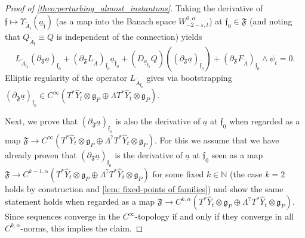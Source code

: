 \documentclass[11pt,a4paper]{scrartcl}
\numberwithin{equation}{section}
\theoremstyle{plain}
\theoremstyle{definition}
\theoremstyle{remark}
\begin{document}
\begin{proof}[Proof of \autoref{theo:perturbing_almost_instantons}]
Taking the derivative of $\mathfrak{f}\mapsto \Upsilon_{\tilde{A}_\mathfrak{f}}(\underline{a}_\mathfrak{f})$ (as a map into the Banach space $W^{0,\alpha}_{-2-\varepsilon,t}$) at $\mathfrak{f}_0 \in \mathfrak{F}$ (and noting that $Q_{\tilde{A}_{\mathfrak{f}}} \equiv Q$ is independent of the connection) yields \[ L_{\tilde{A}_{\mathfrak{f}_0}} (\partial_\mathfrak{F}\underline{a})_{\mathfrak{f}_0} + (\partial_\mathfrak{F}L_{\tilde{A}})_{\mathfrak{f}_0} \underline{a}_{\mathfrak{f}_0} + (D_{\underline{a}_{\mathfrak{f}_0}}Q)((\partial_\mathfrak{F}\underline{a})_{\mathfrak{f}_0}) + (\partial_\mathfrak{F}F_{\tilde{A}})_{\mathfrak{f}_0} \wedge \psi_t = 0.\] Elliptic regularity of the operator $L_{\tilde{A}_{\mathfrak{f}_0}}$ gives via bootstrapping $(\partial_\mathfrak{F}\underline{a})_{\mathfrak{f}_0} \in C^{\infty}(T^*\hat{Y}_t\otimes \mathfrak{g}_P \oplus \Lambda T^*\hat{Y}_t \otimes \mathfrak{g}_P)$. 

Next, we prove that $(\partial_\mathfrak{F}\underline{a})_{\mathfrak{f}_0}$ is also the derivative of $\underline{a}$ at ${\mathfrak{f}_0}$ when regarded as a map $\mathfrak{F} \to C^\infty(T^*\hat{Y}_t \otimes \mathfrak{g}_P \oplus \Lambda^7 T^*\hat{Y}_t \otimes \mathfrak{g}_P)$. For this we assume that we have already proven that $(\partial_\mathfrak{F}\underline{a})_{\mathfrak{f}_0}$ is the derivative of $\underline{a}$ at ${\mathfrak{f}_0}$ seen as a map $\mathfrak{F} \to C^{k-1,\alpha}(T^*\hat{Y}_t \otimes \mathfrak{g}_P \oplus \Lambda^7 T^*\hat{Y}_t \otimes \mathfrak{g}_P)$ for some fixed $k \in \mathbb{N}$ (the case $k=2$ holds by construction and \autoref{lem: fixed-points of families}) and show the same statement holds when regarded as a map $\mathfrak{F} \to C^{k,\alpha}(T^*\hat{Y}_t \otimes \mathfrak{g}_P \oplus \Lambda^7 T^*\hat{Y}_t \otimes \mathfrak{g}_P)$. Since sequences converge in the $C^\infty$-topology if and only if they converge in all $C^{k,\alpha}$-norms, this implies the claim. 


\end{proof}
\end{document}
